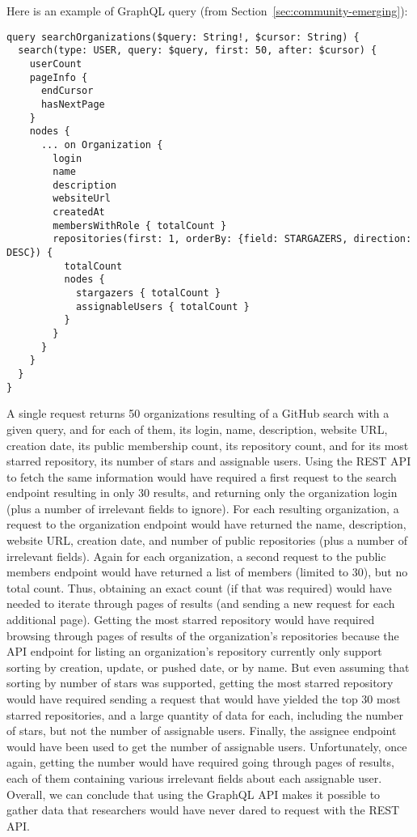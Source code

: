 Here is an example of GraphQL query (from Section~\ref{sec:community-emerging}):

\begin{verbatim}
query searchOrganizations($query: String!, $cursor: String) {
  search(type: USER, query: $query, first: 50, after: $cursor) {
    userCount
    pageInfo {
      endCursor
      hasNextPage
    }
    nodes {
      ... on Organization {
        login
        name
        description
        websiteUrl
        createdAt
        membersWithRole { totalCount }
        repositories(first: 1, orderBy: {field: STARGAZERS, direction: DESC}) {
          totalCount
          nodes {
            stargazers { totalCount }
            assignableUsers { totalCount }
          }
        }
      }
    }
  }
}
\end{verbatim}

A single request returns 50 organizations resulting of a GitHub search with a given query, and for each of them, its login, name, description, website URL, creation date, its public membership count, its repository count, and for its most starred repository, its number of stars and assignable users.
Using the REST API to fetch the same information would have required a first request to the search endpoint resulting in only 30 results, and returning only the organization login (plus a number of irrelevant fields to ignore).
For each resulting organization, a request to the organization endpoint would have returned the name, description, website URL, creation date, and number of public repositories (plus a number of irrelevant fields).
Again for each organization, a second request to the public members endpoint would have returned a list of members (limited to 30), but no total count.
Thus, obtaining an exact count (if that was required) would have needed to iterate through pages of results (and sending a new request for each additional page).
Getting the most starred repository would have required browsing through pages of results of the organization's repositories because the API endpoint for listing an organization's repository currently only support sorting by creation, update, or pushed date, or by name.
But even assuming that sorting by number of stars was supported, getting the most starred repository would have required sending a request that would have yielded the top 30 most starred repositories, and a large quantity of data for each, including the number of stars, but not the number of assignable users.
Finally, the assignee endpoint would have been used to get the number of assignable users.
Unfortunately, once again, getting the number would have required going through pages of results, each of them containing various irrelevant fields about each assignable user.
Overall, we can conclude that using the GraphQL API makes it possible to gather data that researchers would have never dared to request with the REST API.

